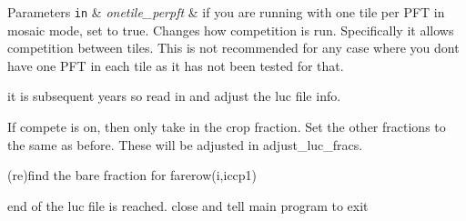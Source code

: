 \begin{DoxyParams}[1]{Parameters}
\mbox{\tt in}  & {\em onetile\+\_\+perpft} & if you are running with one tile per P\+F\+T in mosaic mode, set to true. Changes how competition is run. Specifically it allows competition between tiles. This is not recommended for any case where you don\textquotesingle{}t have one P\+F\+T in each tile as it has not been tested for that. \\
\hline
\end{DoxyParams}




it is subsequent years so read in and adjust the luc file info.

If compete is on, then only take in the crop fraction. Set the other fractions to the same as before. These will be adjusted in adjust\+\_\+luc\+\_\+fracs.

(re)find the bare fraction for farerow(i,iccp1)

end of the luc file is reached. close and tell main program to exit 